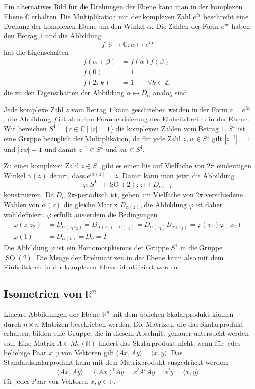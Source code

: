 Ein alternatives Bild für die Drehungen der Ebene kann man in der komplexen
Ebene $\mathbb{C}$ erhalten.
Die Multiplikation mit der komplexen Zahl $e^{i\alpha}$ beschreibt eine
Drehung der komplexen Ebene um den Winkel $\alpha$.
Die Zahlen der Form $e^{i\alpha}$ haben den Betrag $1$ und die Abbildung
\[
f\colon \mathbb{R}\to \mathbb{C}:\alpha \mapsto e^{i\alpha}
\]
hat die Eigenschaften
\begin{align*}
f(\alpha+\beta) &= f(\alpha)f(\beta)
\\
f(0)&=1
\\
f(2\pi k)&=1\qquad\forall k\in\mathbb{Z},
\end{align*}
die zu den Eigenschaften der Abbildung $\alpha\mapsto D_{\alpha}$ 
analog sind.

Jede komplexe Zahl $z$ vom Betrag $1$ kann geschrieben werden in der Form
$z=e^{i\alpha}$, die Abbildung $f$ ist also eine Parametrisierung des
Einheitskreises in der Ebene.
Wir bezeichen $S^1=\{z\in\mathbb{C}\;|\; |z|=1\}$ die komplexen Zahlen vom
Betrag $1$.
$S^1$ ist eine Gruppe bezüglich der Multiplikation, da für jede Zahl
$z,w\in S^1$ gilt
$|z^{-1}|=1$ und $|zw|=1$ und damit $z^{-1}\in S^1$ und $zw\in S^1$.

Zu einer komplexen Zahl $z\in S^1$ gibt es einen bis auf Vielfache
von $2\pi$ eindeutigen Winkel $\alpha(z)$ derart, dass $e^{i\alpha(z)}=z$.
Damit kann man jetzt die Abbildung
\[
\varphi
\colon
S^1\to \operatorname{SO}(2)
:
z\mapsto  D_{\alpha(z)}
\]
konstruieren.
Da $D_{\alpha}$ $2\pi$-periodisch ist, geben um Vielfache
von $2\pi$ verschiedene Wahlen von $\alpha(z)$ die gleiche
Matrix $D_{\alpha(z)}$, die Abbildung $\varphi$ ist daher
wohldefiniert.
$\varphi$ erfüllt ausserdem die Bedingungen
\begin{align*}
\varphi(z_1z_2)
&=
D_{\alpha(z_1z_2)}
=
D_{\alpha(z_1)+\alpha(z_2)}
=
D_{\alpha(z_1)}D_{\alpha(z_2)}
=
\varphi(z_1)\varphi(z_2)
\\
\varphi(1)
&=
D_{\alpha(1)}
=
D_0
=
I
\end{align*}
Die Abbildung $\varphi$ ist ein Homomorphismus der Gruppe $S^1$
in die Gruppe $\operatorname{SO}(2)$.
Die Menge der Drehmatrizen in der Ebene kann also mit dem Einheitskreis
in der komplexen Ebene identifiziert werden.

%
%
\subsection{Isometrien von $\mathbb{R}^n$
\label{buch:gruppen:isometrien}}
Lineare Abbildungen der Ebene $\mathbb{R}^n$ mit dem üblichen Skalarprodukt
können durch $n\times n$-Matrizen beschrieben werden.
Die Matrizen, die das Skalarprodukt erhalten, bilden eine Gruppe,
die in diesem Abschnitt genauer untersucht werden soll.
Eine Matrix $A\in M_{2}(\mathbb{R})$ ändert das Skalarprodukt nicht, wenn
für jedes beliebige Paar $x,y$ von Vektoren gilt
$\langle Ax,Ay\rangle = \langle x,y\rangle$.
Das Standardskalarprodukt kann mit dem Matrixprodukt ausgedrückt werden:
\[
\langle Ax,Ay\rangle
=
(Ax)^tAy
=
x^tA^tAy
=
x^ty
=
\langle x,y\rangle
\]
für jedes Paar von Vektoren $x,y\in\mathbb{R}$.

